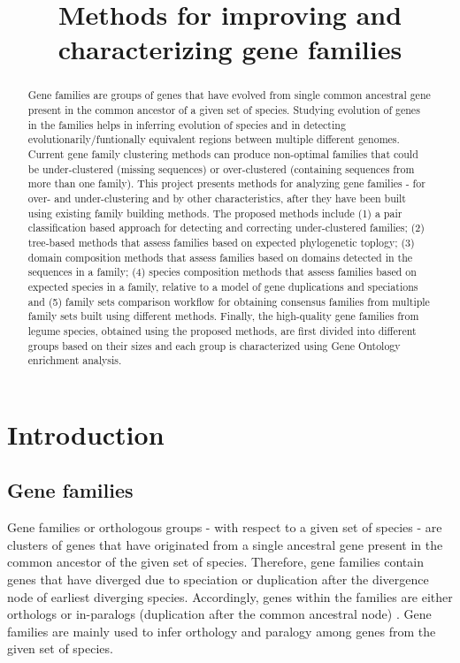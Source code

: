 \documentclass{article}
\date{}
\begin{document}
	\title{Methods for improving and characterizing gene families}
	\maketitle
	\tableofcontents
	\begin{abstract}
	Gene families are groups of genes that have evolved from single common ancestral gene present in the common ancestor of a given set of species. Studying evolution of genes in the families helps in inferring evolution of species and in detecting evolutionarily/funtionally equivalent regions between multiple different genomes. Current gene family clustering methods can produce non-optimal families that could be under-clustered (missing sequences) or over-clustered (containing sequences from more than one family). This project presents methods for analyzing gene families - for over- and under-clustering and by other characteristics, after they have been built using existing family building methods. The proposed methods include (1) a pair classification based approach for detecting and correcting under-clustered families; (2) tree-based methods that assess families based on expected phylogenetic toplogy; (3) domain composition methods that assess families based on domains detected in the sequences in a family; (4) species composition methods that assess families based on expected species in a family, relative to a model of gene duplications and speciations and (5) family sets comparison workflow for obtaining consensus families from multiple family sets built using different methods. Finally, the high-quality gene families from legume species, obtained using the proposed methods, are first divided into different groups based on their sizes and each group is characterized using Gene Ontology enrichment analysis.  
	\end{abstract}
	
	\section{Introduction}
		\subsection{Gene families}
		Gene families or orthologous groups - with respect to a given set of species - are clusters of genes that have originated from a single ancestral gene present in the common ancestor of the given set of species. Therefore, gene families contain genes that have diverged due to speciation or duplication after the divergence node of earliest diverging species. Accordingly, genes within the families are either orthologs or in-paralogs (duplication after the common ancestral node) \citep{fitch1970distinguishing,fitch2000homology, sonnhammer2002orthology}. Gene families are mainly used to infer orthology and paralogy among genes from the given set of species.
		
\end{document}

